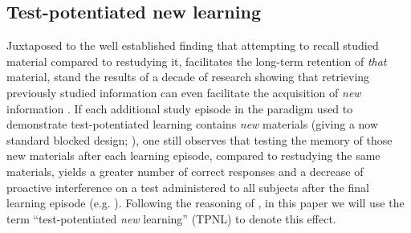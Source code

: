\documentclass[../main.tex]{subfiles}
\begin{document}
\hypertarget{tpnl}{%
\subsection{Test-potentiated new learning}}

Juxtaposed to the well established finding that attempting to recall studied material compared to restudying it, facilitates the long-term retention of \textit{that} material, stand the results of a decade of research showing that retrieving previously studied information can even facilitate the acquisition of \textit{new} information \citep{chanRetrievalPotentiatesNew2018, yangEnhancingLearningRetrieval2018}. If each additional study episode in the paradigm used to demonstrate test-potentiated learning contains \textit{new} materials (giving a now standard blocked design; \cite{chanTestingPotentiatesNew2018}), one still observes that testing the memory of those new materials after each learning episode, compared to restudying the same materials, yields a greater number of correct responses and a decrease of proactive interference on a test administered to all subjects after the final learning episode (e.g. \citealp{szpunarInterpolatedMemoryTests2013, szpunarTestingStudyInsulates2008, wissmanInterimTestEffect2011}). Following the reasoning of \cite{chanRetrievalPotentiatesNew2018}, in this paper we will use the term ``test-potentiated \textit{new} learning'' (TPNL) to denote this effect.
\end{document}
